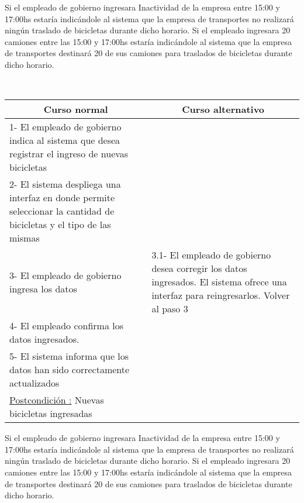 Si el empleado de gobierno ingresara Inactividad de la empresa entre 15:00 y 17:00hs estaría indicándole al sistema que la empresa de transportes no realizará ningún
traslado de bicicletas durante dicho horario.
Si el empleado ingresara 20 camiones entre las 15:00 y 17:00hs estaría indicándole al sistema que la empresa de transportes destinará 20 de sus camiones para traslados
de bicicletas durante dicho horario.

~


\begin{center}
    \centering
    \begin{tabular}{ | p{11cm} | p{6cm} | }
    	\multicolumn{1}{c}{\cellcolor{black!30}\textbf{Curso normal}} & 
    	\multicolumn{1}{c}{\cellcolor{black!30}\textbf{Curso alternativo}} \\ \hline
    	1- El empleado de gobierno indica al sistema que desea registrar el ingreso de nuevas bicicletas & \\ \hline
    	2- El sistema despliega una interfaz en donde permite seleccionar la cantidad de bicicletas y el tipo de las mismas & \\ \hline
    	3- El empleado de gobierno ingresa los datos & 3.1- El empleado de gobierno desea corregir los datos ingresados. El sistema ofrece una interfaz para reingresarlos. Volver al paso 3 \\ \hline
    	4- El empleado confirma los datos ingresados. & \\ \hline
    	5- El sistema informa que los datos han sido correctamente actualizados & \\ \hline
    	\underline{Postcondición :} Nuevas bicicletas ingresadas & \\ \hline
    \end{tabular}
\end{center}

Si el empleado de gobierno ingresara Inactividad de la empresa entre 15:00 y 17:00hs estaría indicándole al sistema que la empresa de transportes no realizará ningún
traslado de bicicletas durante dicho horario.
Si el empleado ingresara 20 camiones entre las 15:00 y 17:00hs estaría indicándole al sistema que la empresa de transportes destinará 20 de sus camiones para traslados
de bicicletas durante dicho horario.

~


